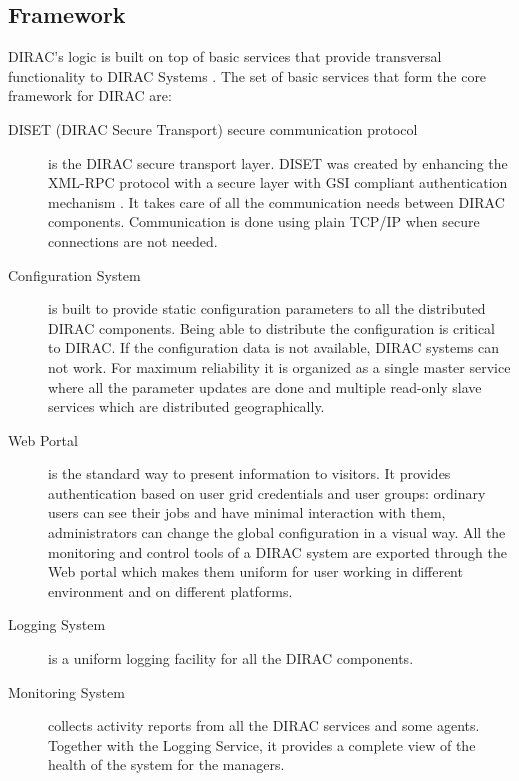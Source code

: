 \subsection{Framework}
DIRAC’s logic is built on top of basic services that provide transversal
functionality to DIRAC Systems \cite{DISET}. The set of basic services that form the core framework for
DIRAC are: 

\begin{description}

\item[DISET (DIRAC Secure Transport) secure communication protocol] 
	is the DIRAC secure transport layer. DISET was created by enhancing the XML-RPC
	protocol with a secure layer with GSI compliant authentication mechanism \cite{DISET2}.
	It takes care of all the communication needs between DIRAC components. 
	Communication is done using plain TCP/IP when secure connections are not needed.
	
\item[Configuration System] 
	is built to provide static configuration parameters to all the distributed DIRAC components. Being able to
	distribute the configuration is critical to DIRAC. If the configuration data is not available, 
	DIRAC systems can not work. For maximum reliability it is organized as a single master service where 
	all the parameter updates are done and multiple read-only slave services which are distributed geographically.

\item[Web Portal]  
	is the standard way to present information to visitors. It provides authentication based on user grid
	credentials and user groups: ordinary users can see their jobs and have minimal interaction with
	them, administrators can change the global configuration in a visual way. All the monitoring and control
	tools of a DIRAC system are exported through the Web portal which makes them uniform for user
	working in different environment and on different platforms.
	
\item[Logging System] 
	is a uniform logging facility for all the DIRAC components.

\item[Monitoring System]
	collects activity reports from all the DIRAC services and some agents. Together
	with the Logging Service, it provides a complete view of the health of the system for the managers.

\end{description}

